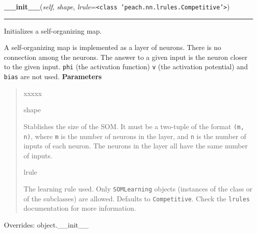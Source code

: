 \hspace{.8\funcindent}\begin{boxedminipage}{\funcwidth}

    \raggedright \textbf{\_\_init\_\_}(\textit{self}, \textit{shape}, \textit{lrule}={\tt {\textless}class 'peach.nn.lrules.Competitive'{\textgreater}})

    \vspace{-1.5ex}

    \rule{\textwidth}{0.5\fboxrule}
\setlength{\parskip}{2ex}

Initializes a self-organizing map.

A self-organizing map is implemented as a layer of neurons. There is no
connection among the neurons. The answer to a given input is the neuron
closer to the given input. \texttt{phi} (the activation function) \texttt{v} (the
activation potential) and \texttt{bias} are not used.
\setlength{\parskip}{1ex}
      \textbf{Parameters}
      \vspace{-1ex}

      \begin{quote}
        \begin{Ventry}{xxxxx}

          \item[shape]


Stablishes the size of the SOM. It must be a two-tuple of the
format \texttt{(m, n)}, where \texttt{m} is the number of neurons in the
layer, and \texttt{n} is the number of inputs of each neuron. The neurons
in the layer all have the same number of inputs.
          \item[lrule]


The learning rule used. Only \texttt{SOMLearning} objects (instances of
the class or of the subclasses) are allowed. Defaults to
\texttt{Competitive}. Check the \texttt{lrules} documentation for more
information.
        \end{Ventry}

      \end{quote}

      Overrides: object.\_\_init\_\_

    \end{boxedminipage}

    \vspace{0.5ex}

